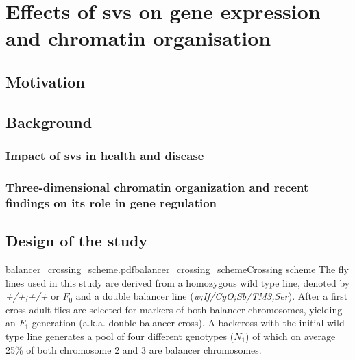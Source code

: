\chapter{Effects of \acsp{sv} on gene expression and chromatin organisation}
\label{sec:balancer}

\section{Motivation}

\section{Background}
\subsection{Impact of \texorpdfstring{\acp{sv}}{SVs} in health and disease}
\subsection{Three-dimensional chromatin organization and recent findings on its role in gene regulation}


\section{Design of the study}



    {balancer_crossing_scheme.pdf}{balancer_crossing_scheme}{Crossing scheme}{
        The fly lines used in this study are derived from a homozygous wild type
        line, denoted by \textit{+/+;+/+} or $F_0$ and a double balancer line
        (\textit{w;If/CyO;Sb/TM3,Ser}). After a first cross adult flies are
        selected for markers of both balancer chromosomes, yielding an $F_1$
        generation (a.k.a. double balancer cross). A backcross with the initial
        wild type line generates a pool of four different genotypes ($N_1$)
        of which on average 25\% of both chromosome 2 and 3 are balancer
        chromosomes.}

